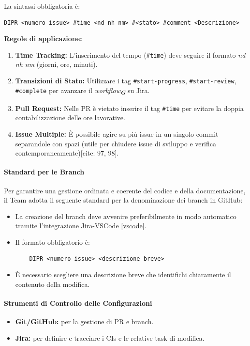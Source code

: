 \documentclass[a4paper,12pt]{article}
\newcommand{\glossario}[1]{\textit{#1}\textsubscript{\textbf{\textit{\textcolor{lightblack}{G}}}}}
\begin{document}
La sintassi obbligatoria è:
\begin{verbatim}
DIPR-<numero issue> #time <nd nh nm> #<stato> #comment <Descrizione> 
\end{verbatim}

\textbf{Regole di applicazione:}
\begin{enumerate}
    \item \textbf{Time Tracking:} L'inserimento del tempo (\texttt{\#time}) deve seguire il formato \textit{nd nh nm} (giorni, ore, minuti).
    \item \textbf{Transizioni di Stato:} Utilizzare i tag \texttt{\#start-progress}, \texttt{\#start-review}, \texttt{\#complete} per avanzare il \glossario{workflow} su Jira.
    \item \textbf{Pull Request:} Nelle PR è vietato inserire il tag \texttt{\#time} per evitare la doppia contabilizzazione delle ore lavorative.
    \item \textbf{Issue Multiple:} È possibile agire su più issue in un singolo commit separandole con spazi (utile per chiudere issue di sviluppo e verifica contemporaneamente)[cite: 97, 98].
\end{enumerate}

\paragraph{Standard per le Branch} \label{stdBranch}
Per garantire una gestione ordinata e coerente del codice e della
documentazione, il Team adotta il seguente standard per la denominazione dei
branch in GitHub:
\begin{itemize}
    \item La creazione del branch deve avvenire preferibilmente in modo automatico
          tramite l'integrazione Jira-VSCode \ref{vscode}.
    \item Il formato obbligatorio è:
    \begin{verbatim}
    DIPR-<numero issue>-<descrizione-breve>
    \end{verbatim}
    \item È necessario scegliere una descrizione breve che identifichi chiaramente il contenuto della modifica.
\end{itemize}

\paragraph{Strumenti di Controllo delle Configurazioni}
\begin{itemize}
    \item \textbf{Git/GitHub:} per la gestione di PR e branch.
    \item \textbf{Jira:} per definire e tracciare i CIs e le relative task di modifica.
\end{itemize}
\end{document}
